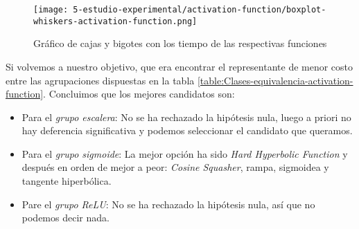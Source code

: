 \begin{table}[H]
    \centering
    \caption{Tiempo de ejecución en segundos}
    \label{Tiempos-ejecucion-comparativas}
\end{table}

\begin{figure}[H]
    \centering
     \texttt{[image: 5-estudio-experimental/activation-function/boxplot-whiskers-activation-function.png]}
     \caption{Gráfico de cajas y bigotes con los tiempo de las respectivas funciones}
     \label{img:boxplot-whiskers-activation-function}
\end{figure}

Si volvemos a nuestro objetivo, que era encontrar el representante de 
menor costo entre las agrupaciones dispuestas en la tabla \ref{table:Clases-equivalencia-activation-function}. Concluimos que los mejores candidatos son: 

\begin{itemize}
    \item Para el \textit{grupo escalera}: No se ha rechazado la hipótesis nula, luego a priori no hay deferencia significativa y podemos seleccionar el candidato que queramos. 
    \item Para el \textit{grupo sigmoide}: La mejor opción ha sido \textit{Hard Hyperbolic Function} y  después en orden de mejor a peor: \textit{Cosine Squasher}, rampa, sigmoidea y tangente hiperbólica.
    \item Pare el \textit{grupo ReLU}: No se ha rechazado la hipótesis nula, así que no podemos decir nada. 
\end{itemize}

